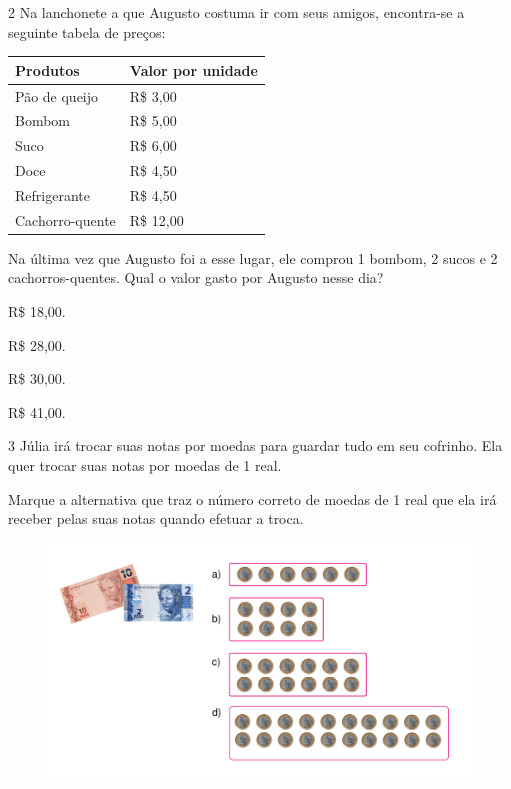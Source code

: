 \num{2} Na lanchonete a que Augusto costuma ir com seus amigos, encontra-se a
seguinte tabela de preços:

\begin{longtable}[]{@{}ll@{}}
\toprule
\hline
\textbf{Produtos} & \textbf{Valor por unidade}\tabularnewline
\hline
\midrule
\endhead
Pão de queijo & R\$ 3,00\tabularnewline
\hline
Bombom & R\$ 5,00\tabularnewline
\hline
Suco & R\$ 6,00\tabularnewline
\hline
Doce & R\$ 4,50\tabularnewline
\hline
Refrigerante & R\$ 4,50\tabularnewline
\hline
Cachorro-quente & R\$ 12,00\tabularnewline
\bottomrule
\end{longtable}

Na última vez que Augusto foi a esse lugar, ele comprou 1 bombom, 2
sucos e 2 cachorros-quentes. Qual o valor gasto por Augusto nesse dia?

\begin{multicols}{2}
\begin{escolha}
\item
  R\$ 18,00.
\item
  R\$ 28,00.
\item
  R\$ 30,00.
\item
  R\$ 41,00.
\end{escolha}
\end{multicols}

\num{3} Júlia irá trocar suas notas por moedas para guardar tudo em seu
cofrinho. Ela quer trocar suas notas por moedas de 1 real.

Marque a
alternativa que traz o número correto de moedas de 1 real que ela
irá receber pelas suas notas quando efetuar a troca.

\begin{figure}[htpb!]
\centering
\includegraphics[width=\textwidth]{./media/image74.png}
\end{figure}


